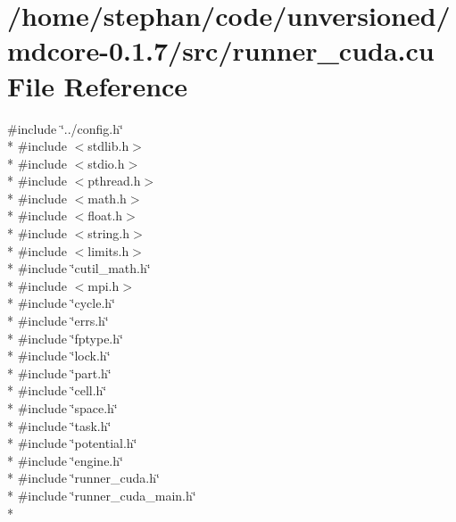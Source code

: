 \hypertarget{runner__cuda_8cu}{\section{/home/stephan/code/unversioned/mdcore-\/0.1.7/src/runner\-\_\-cuda.cu File Reference}
\label{runner__cuda_8cu}
}
{\ttfamily \#include \char`\"{}../config.\-h\char`\"{}}\\*
{\ttfamily \#include $<$stdlib.\-h$>$}\\*
{\ttfamily \#include $<$stdio.\-h$>$}\\*
{\ttfamily \#include $<$pthread.\-h$>$}\\*
{\ttfamily \#include $<$math.\-h$>$}\\*
{\ttfamily \#include $<$float.\-h$>$}\\*
{\ttfamily \#include $<$string.\-h$>$}\\*
{\ttfamily \#include $<$limits.\-h$>$}\\*
{\ttfamily \#include \char`\"{}cutil\-\_\-math.\-h\char`\"{}}\\*
{\ttfamily \#include $<$mpi.\-h$>$}\\*
{\ttfamily \#include \char`\"{}cycle.\-h\char`\"{}}\\*
{\ttfamily \#include \char`\"{}errs.\-h\char`\"{}}\\*
{\ttfamily \#include \char`\"{}fptype.\-h\char`\"{}}\\*
{\ttfamily \#include \char`\"{}lock.\-h\char`\"{}}\\*
{\ttfamily \#include \char`\"{}part.\-h\char`\"{}}\\*
{\ttfamily \#include \char`\"{}cell.\-h\char`\"{}}\\*
{\ttfamily \#include \char`\"{}space.\-h\char`\"{}}\\*
{\ttfamily \#include \char`\"{}task.\-h\char`\"{}}\\*
{\ttfamily \#include \char`\"{}potential.\-h\char`\"{}}\\*
{\ttfamily \#include \char`\"{}engine.\-h\char`\"{}}\\*
{\ttfamily \#include \char`\"{}runner\-\_\-cuda.\-h\char`\"{}}\\*
{\ttfamily \#include \char`\"{}runner\-\_\-cuda\-\_\-main.\-h\char`\"{}}\\*
